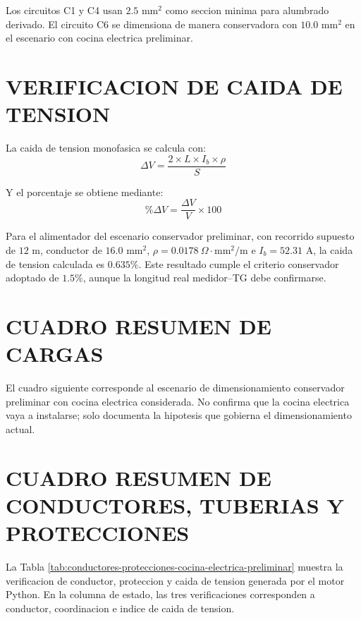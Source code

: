 Los circuitos C1 y C4 usan \(2.5\text{ mm}^2\) como seccion minima para alumbrado derivado. El circuito C6 se dimensiona de manera conservadora con \(10.0\text{ mm}^2\) en el escenario con cocina electrica preliminar.

\section{VERIFICACION DE CAIDA DE TENSION}

La caida de tension monofasica se calcula con:
\begin{equation}
\Delta V=\frac{2\times L\times I_b\times\rho}{S}
\end{equation}

Y el porcentaje se obtiene mediante:
\begin{equation}
\%\Delta V=\frac{\Delta V}{V}\times100
\end{equation}

Para el alimentador del escenario conservador preliminar, con recorrido supuesto de \(12\text{ m}\), conductor de \(16.0\text{ mm}^2\), \(\rho=0.0178\ \Omega\cdot\text{mm}^2/\text{m}\) e \(I_b=52.31\text{ A}\), la caida de tension calculada es \(0.635\%\). Este resultado cumple el criterio conservador adoptado de \(1.5\%\), aunque la longitud real medidor--TG debe confirmarse.

\section{CUADRO RESUMEN DE CARGAS}

El cuadro siguiente corresponde al escenario de dimensionamiento conservador preliminar con cocina electrica considerada. No confirma que la cocina electrica vaya a instalarse; solo documenta la hipotesis que gobierna el dimensionamiento actual.



\section{CUADRO RESUMEN DE CONDUCTORES, TUBERIAS Y PROTECCIONES}

La Tabla \ref{tab:conductores-protecciones-cocina-electrica-preliminar} muestra la verificacion de conductor, proteccion y caida de tension generada por el motor Python. En la columna de estado, las tres verificaciones corresponden a conductor, coordinacion e indice de caida de tension.

